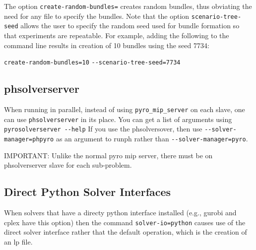 The option \verb|create-random-bundles=| creates random bundles, thus obviating the need for
any file to specify the bundles. Note that the option \verb|scenario-tree-seed| allows the user to specify the random seed used
for bundle formation so that experiments are repeatable.  For example, adding the following to the command line results in creation
of 10 bundles using the seed 7734:

\verb|create-random-bundles=10| \verb|--scenario-tree-seed=7734| 

\subsection{phsolverserver}

When running in parallel, instead of using  \verb|pyro_mip_server| on each slave, one can use
\verb|phsolverserver| in its place. 
You can get a list of arguments using \verb|pyrosolverserver --help|
If you use the phsolversover, then use \verb|--solver-manager=phpyro| as an argument to runph rather
than \verb|--solver-manager=pyro|.

IMPORTANT: Unlike the normal pyro mip server, there must be on phsolverserver slave for each sub-problem. 

\subsection{Direct Python Solver Interfaces}

When solvers that have a directy python interface installed (e.g., gurobi and cplex have this option) then the command \verb|solver-io=python| causes use of the direct solver interface rather that the default operation, which is the creation of an lp file.

